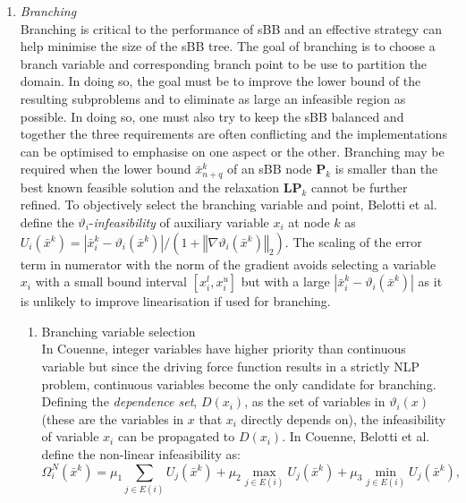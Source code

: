\begin{enumerate}
	\item \emph{Branching}\\
		Branching is critical to the performance of sBB and an effective strategy can help minimise the size of the sBB tree. The goal of branching is to choose a branch variable and corresponding branch point to be use to partition the domain. In doing so, the goal must be to improve the lower bound of the resulting subproblems and to eliminate as large an infeasible region as possible. In doing so, one must also try to keep the sBB balanced and together the three requirements are often conflicting and the implementations can be optimised to emphasise on one aspect or the other. Branching may be required when the lower bound $\bar{x}_{n+q}^k$ of an sBB node $\mathbf{P}_k$ is smaller than the best known feasible solution and the relaxation $\mathbf{LP}_k$ cannot be further refined. To objectively select the branching variable and point, Belotti et al. \cite{Belotti:2009aa} define the $\vartheta_i$-\textit{infeasibility} of auxiliary variable $x_i$ at node $k$ as $U_i\left(\bar{x}^k\right) = \left|\bar{x}_i^k - \vartheta_i\left(\bar{x}^k\right) \right| \slash \left(1 + \left \Vert \nabla \vartheta_i(\bar{x}^k)  \right \Vert_2\right)$. The scaling of the error term in numerator with the norm of the gradient avoids selecting a variable $x_i$ with a small bound interval $[x_i^l, x_i^u]$ but with a large $\left|\bar{x}_i^k - \vartheta_i\left(\bar{x}^k\right) \right|$ as it is unlikely to improve linearisation if used for branching.
		\begin{enumerate}
			\item	Branching variable selection\\
				In Couenne, integer variables have higher priority than continuous variable but since the driving force function results in a strictly NLP problem, continuous variables become the only candidate for branching. Defining the \emph{dependence set}, $D(x_i)$, as the set of variables in $\vartheta_i(x)$ (these are the variables in $x$ that $x_i$ directly depends on), the infeasibility of variable $x_i$ can be propagated to $D(x_i)$. In Couenne, Belotti et al. \cite{Belotti:2009aa} define the non-linear infeasibility as:
				\[
					\Omega_i^N(\bar{x}^k) = \mu_1 \sum_{j\in E(i)} U_j(\bar{x}^k) +  \mu_2 \max_{j\in E(i)} U_j(\bar{x}^k) +  \mu_3 \min_{j\in E(i)} U_j(\bar{x}^k),
				\]

\end{enumerate}
\end{enumerate}
